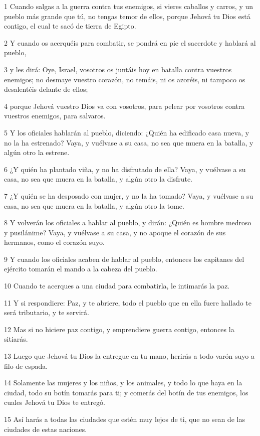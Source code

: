 \par 1 Cuando salgas a la guerra contra tus enemigos, si vieres caballos y carros, y un pueblo más grande que tú, no tengas temor de ellos, porque Jehová tu Dios está contigo, el cual te sacó de tierra de Egipto.
\par 2 Y cuando os acerquéis para combatir, se pondrá en pie el sacerdote y hablará al pueblo,
\par 3 y les dirá: Oye, Israel, vosotros os juntáis hoy en batalla contra vuestros enemigos; no desmaye vuestro corazón, no temáis, ni os azoréis, ni tampoco os desalentéis delante de ellos;
\par 4 porque Jehová vuestro Dios va con vosotros, para pelear por vosotros contra vuestros enemigos, para salvaros.
\par 5 Y los oficiales hablarán al pueblo, diciendo: ¿Quién ha edificado casa nueva, y no la ha estrenado? Vaya, y vuélvase a su casa, no sea que muera en la batalla, y algún otro la estrene.
\par 6 ¿Y quién ha plantado viña, y no ha disfrutado de ella? Vaya, y vuélvase a su casa, no sea que muera en la batalla, y algún otro la disfrute.
\par 7 ¿Y quién se ha desposado con mujer, y no la ha tomado? Vaya, y vuélvase a su casa, no sea que muera en la batalla, y algún otro la tome.
\par 8 Y volverán los oficiales a hablar al pueblo, y dirán: ¿Quién es hombre medroso y pusilánime? Vaya, y vuélvase a su casa, y no apoque el corazón de sus hermanos, como el corazón suyo.
\par 9 Y cuando los oficiales acaben de hablar al pueblo, entonces los capitanes del ejército tomarán el mando a la cabeza del pueblo.
\par 10 Cuando te acerques a una ciudad para combatirla, le intimarás la paz.
\par 11 Y si respondiere: Paz, y te abriere, todo el pueblo que en ella fuere hallado te será tributario, y te servirá.
\par 12 Mas si no hiciere paz contigo, y emprendiere guerra contigo, entonces la sitiarás. 
\par 13 Luego que Jehová tu Dios la entregue en tu mano, herirás a todo varón suyo a filo de espada.
\par 14 Solamente las mujeres y los niños, y los animales, y todo lo que haya en la ciudad, todo su botín tomarás para ti; y comerás del botín de tus enemigos, los cuales Jehová tu Dios te entregó.
\par 15 Así harás a todas las ciudades que estén muy lejos de ti, que no sean de las ciudades de estas naciones.
